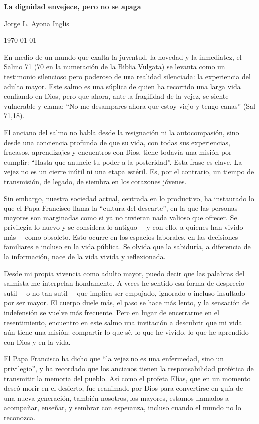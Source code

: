 \documentclass[12pt]{article}
\newcommand{\titulo}[1]{\begin{center}\textbf{\large #1}\end{center}}
\newcommand{\autor}[1]{\begin{center}#1\end{center}}
\newcommand{\fecha}[1]{\begin{center}#1\end{center}}
\begin{document}
\titulo{La dignidad envejece, pero no se apaga}
\autor{Jorge L. Ayona Inglis}
\fecha{\today}

En medio de un mundo que exalta la juventud, la novedad y la inmediatez, el Salmo 71 (70 en la numeración de la Biblia Vulgata) se levanta como un testimonio silencioso pero poderoso de una realidad silenciada: la experiencia del adulto mayor. Este salmo es una súplica de quien ha recorrido una larga vida confiando en Dios, pero que ahora, ante la fragilidad de la vejez, se siente vulnerable y clama: “No me desampares ahora que estoy viejo y tengo canas” (Sal 71,18).

El anciano del salmo no habla desde la resignación ni la autocompasión, sino desde una conciencia profunda de que su vida, con todas sus experiencias, fracasos, aprendizajes y encuentros con Dios, tiene todavía una misión por cumplir: “Hasta que anuncie tu poder a la posteridad”. Esta frase es clave. La vejez no es un cierre inútil ni una etapa estéril. Es, por el contrario, un tiempo de transmisión, de legado, de siembra en los corazones jóvenes.

Sin embargo, nuestra sociedad actual, centrada en lo productivo, ha instaurado lo que el Papa Francisco llama la “cultura del descarte”, en la que las personas mayores son marginadas como si ya no tuvieran nada valioso que ofrecer. Se privilegia lo nuevo y se considera lo antiguo —y con ello, a quienes han vivido más— como obsoleto. Esto ocurre en los espacios laborales, en las decisiones familiares e incluso en la vida pública. Se olvida que la sabiduría, a diferencia de la información, nace de la vida vivida y reflexionada.

Desde mi propia vivencia como adulto mayor, puedo decir que las palabras del salmista me interpelan hondamente. A veces he sentido esa forma de desprecio sutil —o no tan sutil— que implica ser empujado, ignorado o incluso insultado por ser mayor. El cuerpo duele más, el paso se hace más lento, y la sensación de indefensión se vuelve más frecuente. Pero en lugar de encerrarme en el resentimiento, encuentro en este salmo una invitación a descubrir que mi vida aún tiene una misión: compartir lo que sé, lo que he vivido, lo que he aprendido con Dios y en la vida.

El Papa Francisco ha dicho que “la vejez no es una enfermedad, sino un privilegio”, y ha recordado que los ancianos tienen la responsabilidad profética de transmitir la memoria del pueblo. Así como el profeta Elías, que en un momento deseó morir en el desierto, fue reanimado por Dios para convertirse en guía de una nueva generación, también nosotros, los mayores, estamos llamados a acompañar, enseñar, y sembrar con esperanza, incluso cuando el mundo no lo reconozca.
\end{document}
